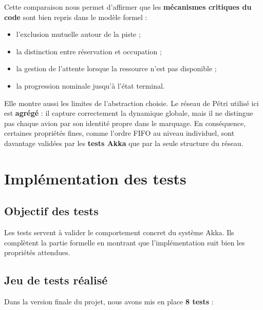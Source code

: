\documentclass[11pt,a4paper]{article}
\begin{document}
Cette comparaison nous permet d'affirmer que les \textbf{mécanismes critiques du code} sont bien repris dans le modèle formel :
\begin{itemize}
    \item l'exclusion mutuelle autour de la piste ;
    \item la distinction entre réservation et occupation ;
    \item la gestion de l'attente lorsque la ressource n'est pas disponible ;
    \item la progression nominale jusqu'à l'état terminal.
\end{itemize}

Elle montre aussi les limites de l'abstraction choisie. Le réseau de Pétri utilisé ici est \textbf{agrégé} : il capture correctement la dynamique globale, mais il ne distingue pas chaque avion par son identité propre dans le marquage. En conséquence, certaines propriétés fines, comme l'ordre FIFO au niveau individuel, sont davantage validées par les \textbf{tests Akka} que par la seule structure du réseau.

\section{Implémentation des tests}

\subsection{Objectif des tests}

Les tests servent à valider le comportement concret du système Akka. Ils complètent la partie formelle en montrant que l'implémentation suit bien les propriétés attendues.

\subsection{Jeu de tests réalisé}

Dans la version finale du projet, nous avons mis en place \textbf{8 tests} :
\end{document}
